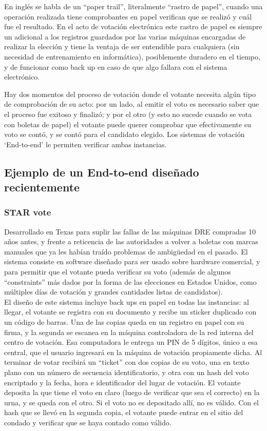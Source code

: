 En inglés se habla de un “paper trail”, literalmente “rastro de papel”, cuando una operación realizada tiene comprobantes en papel verifican que se realizó y cuál fue el resultado. En el acto de votación electrónica este rastro de papel es siempre un adicional a los registros guardados por las varias máquinas encargadas de realizar la elección y tiene la ventaja de ser entendible para cualquiera (sin necesidad de entrenamiento en informática), posiblemente duradero en el tiempo, y de funcionar como back up en caso de que algo fallara con el sistema electrónico.

Hay dos momentos del proceso de votación donde el votante necesita algún tipo de comprobación de su acto: por un lado, al emitir el voto es necesario saber que el proceso fue exitoso y finalizó; y por el otro (y esto no sucede cuando se vota con boletas de papel) el votante puede querer comprobar que efectivamente su voto se contó, y se contó para el candidato elegido. Los sistemas de votación ‘End-to-end’ le permiten verificar ambas instancias.

\subsection{Ejemplo de un End-to-end diseñado recientemente}

\subsubsection{STAR vote}
Desarrollado en Texas para suplir las fallas de las máquinas DRE compradas 10 años antes, y frente a reticencia de las autoridades a volver a boletas con marcas manuales que ya les habían traído problemas de ambigüedad en el pasado.
El sistema consiste en software diseñado para ser usado sobre hardware comercial, y para permitir que el votante pueda verificar su voto (además de algunos “constraints” más dados por la forma de las elecciones en Estados Unidos, como múltiples días de votación y grandes cantidades listas de candidatos)\cite{star}.\\

El diseño de este sistema incluye back ups en papel en todas las instancias: al llegar, el votante se registra con su documento y recibe un sticker duplicado con un código de barras. Una de las copias queda en un registro en papel con su firma, y la segunda se escanea en la máquina controladora de la red interna del centro de votación. Esa computadora le entrega un PIN de 5 dígitos, único a esa central, que el usuario ingresará en la máquina de votación propiamente dicha. Al terminar de votar recibirá un “ticket” con dos copias de su voto, una en texto plano con un número de secuencia identificatorio, y otra con un hash del voto encriptado y la fecha, hora e identificador del lugar de votación. El votante deposita la que tiene el voto en claro (luego de verificar que sea el correcto) en la urna, y se queda con el otro. Si el voto no es depositado allí, no es válido. Con el hash que se llevó en la segunda copia, el votante puede entrar en el sitio del condado y verificar que se haya contado como válido.\\

